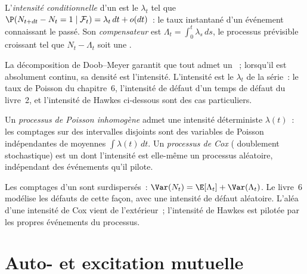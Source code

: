 \begin{definition}\label{def:qm:point-processes-and-hawkes-processes:intensity}
L'\emph{intensité conditionnelle} d'un  est le 
$\lambda_t$ tel que $\P(N_{t+dt} - N_t = 1 \mid \mathcal F_t) = \lambda_t\,dt + o(dt)$~: le taux instantané d'un événement
connaissant le passé. Son \emph{compensateur} est $\Lambda_t = \int_0^t\lambda_s\,ds$, le processus prévisible
croissant tel que $N_t - \Lambda_t$ soit une .
\end{definition}

La décomposition de Doob--Meyer garantit que tout  admet un ~; lorsqu'il est
absolument continu, sa densité est l'intensité. L'intensité est le $\lambda_t$ de la série~: le taux de Poisson
du chapitre~6, l'intensité de défaut d'un temps de défaut du livre~2, et l'intensité de Hawkes
ci-dessous sont des cas particuliers.

\begin{definition}\label{def:qm:point-processes-and-hawkes-processes:cox}
Un \emph{processus de Poisson inhomogène} admet une intensité déterministe
$\lambda(t)$~: les comptages sur des intervalles disjoints sont des variables de Poisson indépendantes de moyennes $\int\lambda(t)\,dt$. Un \emph{processus de
Cox} ( doublement stochastique) est un  dont l'intensité est
elle-même un processus aléatoire, indépendant des événements qu'il pilote.
\end{definition}

Les comptages d'un  sont surdispersés~: $\Var(N_t) = \E[\Lambda_t] + \Var(\Lambda_t)$. Le livre~6 modélise les défauts
de cette façon, avec une intensité de défaut aléatoire. L'aléa d'une intensité de Cox vient de l'extérieur~; l'intensité de Hawkes
est pilotée par les propres événements du processus.

\section{Auto- et excitation mutuelle}

